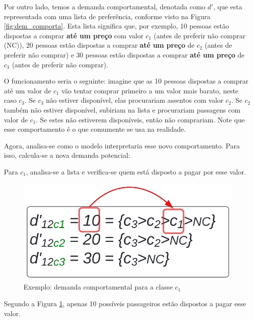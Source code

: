 Por outro lado, temos a demanda comportamental, denotada como $d'$, que esta representada com uma lista de preferência, conforme visto na Figura \ref{fig:dem_comporta}. Esta lista significa que, por exemplo, 10 pessoas estão dispostas a comprar \textbf{até um preço} com valor $c_1$ (antes de preferir não comprar (NC)), 20 pessoas estão dispostas a comprar \textbf{até um preço} de $c_2$  (antes de preferir não comprar) e 30 pessoas estão dispostas a comprar \textbf{até um preço} de $c_3$  (antes de preferir não comprar).

O funcionamento seria o seguinte: imagine que as 10 pessoas dispostas a comprar até um valor de $c_1$ vão tentar comprar primeiro a um valor mais barato, neste caso $c_3$. Se $c_3$ não estiver disponível, elas procurariam assentos com valor $c_2$. Se $c_2$ também não estiver disponível, subiriam na lista e procurariam passagens com valor de $c_1$. Se estes não estiverem disponíveis, então não comprariam. Note que esse comportamento é o que comumente se usa na realidade.

Agora, analisa-se como o modelo interpretaria esse novo comportamento. Para isso, calcula-se a nova demanda potencial:

Para $c_1$, analisa-se a lista e verifica-se quem está disposto a pagar por esse valor.
\begin{figure}[H]
	\begin{center}
		\includegraphics[scale=0.24]{img/dem_compo_c1.png}
		\caption{Exemplo: demanda comportamental para a classe $c_1$}
		\label{fig: exemplo_dem_c1}
	\end{center}
\end{figure}

Segundo a Figura \ref{fig: exemplo_dem_c1}, apenas 10 possíveis passageiros estão dispostos a pagar esse valor.

